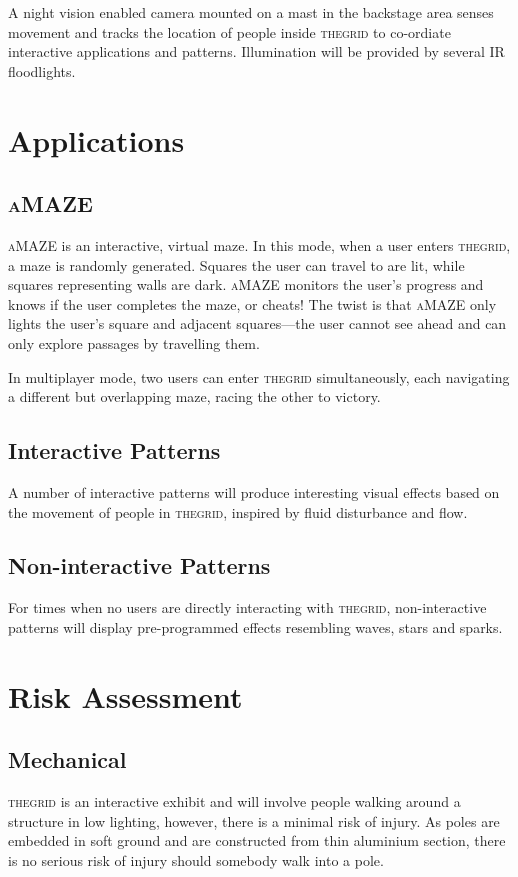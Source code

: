 \documentclass[12pt]{article} %
\newcommand{\thegrid}{\textsc{the\textperiodcentered grid}\xspace}
\newcommand{\amaze}{\textsc{aMAZE}\xspace}
\begin{document}
A night vision enabled camera mounted on a mast in the backstage area senses
movement and tracks the location of people inside \thegrid to co-ordiate
interactive applications and patterns.  Illumination will be provided by
several IR floodlights.

\section{Applications}
\subsection{\amaze}
\amaze is an interactive, virtual maze.  In this mode, when a user enters
\thegrid, a maze is randomly generated.  Squares the user can travel to are
lit, while squares representing walls are dark.  \amaze monitors the user's
progress and knows if the user completes the maze, or cheats!  The twist is
that \amaze only lights the user's square and adjacent squares---the user
cannot see ahead and can only explore passages by travelling them.

In multiplayer mode, two users can enter \thegrid simultaneously, each
navigating a different but overlapping maze, racing the other to victory.

\subsection{Interactive Patterns}
A number of interactive patterns will produce interesting visual effects based
on the movement of people in \thegrid, inspired by fluid disturbance and flow.

\subsection{Non-interactive Patterns}
For times when no users are directly interacting with \thegrid, non-interactive
patterns will display pre-programmed effects resembling waves, stars and
sparks.

\clearpage
\section{Risk Assessment}
\subsection{Mechanical}
\thegrid is an interactive exhibit and will involve people walking around a
structure in low lighting, however, there is a minimal risk of injury.  As
poles are embedded in soft ground and are constructed from thin aluminium
section, there is no serious risk of injury should somebody walk into a pole.
\end{document}
